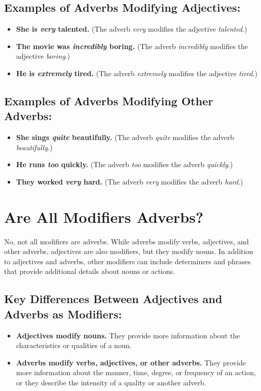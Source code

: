 \documentclass{book}
\begin{document}
\subsection{Examples of Adverbs Modifying Adjectives:}
\begin{itemize}
	\item \textbf{She is \textit{very} talented.} (The adverb \textit{very} modifies the adjective \textit{talented}.)
	\item \textbf{The movie was \textit{incredibly} boring.} (The adverb \textit{incredibly} modifies the adjective \textit{boring}.)
	\item \textbf{He is \textit{extremely} tired.} (The adverb \textit{extremely} modifies the adjective \textit{tired}.)
\end{itemize}

\subsection{Examples of Adverbs Modifying Other Adverbs:}
\begin{itemize}
	\item \textbf{She sings \textit{quite} beautifully.} (The adverb \textit{quite} modifies the adverb \textit{beautifully}.)
	\item \textbf{He runs \textit{too} quickly.} (The adverb \textit{too} modifies the adverb \textit{quickly}.)
	\item \textbf{They worked \textit{very} hard.} (The adverb \textit{very} modifies the adverb \textit{hard}.)
\end{itemize}

\section{Are All Modifiers Adverbs?}
No, not all modifiers are adverbs. While adverbs modify verbs, adjectives, and other adverbs, adjectives are also modifiers, but they modify nouns. In addition to adjectives and adverbs, other modifiers can include determiners and phrases that provide additional details about nouns or actions.

\subsection{Key Differences Between Adjectives and Adverbs as Modifiers:}
\begin{itemize}
	\item \textbf{Adjectives modify nouns.} They provide more information about the characteristics or qualities of a noun.
	\item \textbf{Adverbs modify verbs, adjectives, or other adverbs.} They provide more information about the manner, time, degree, or frequency of an action, or they describe the intensity of a quality or another adverb.
\end{itemize}
\end{document}
